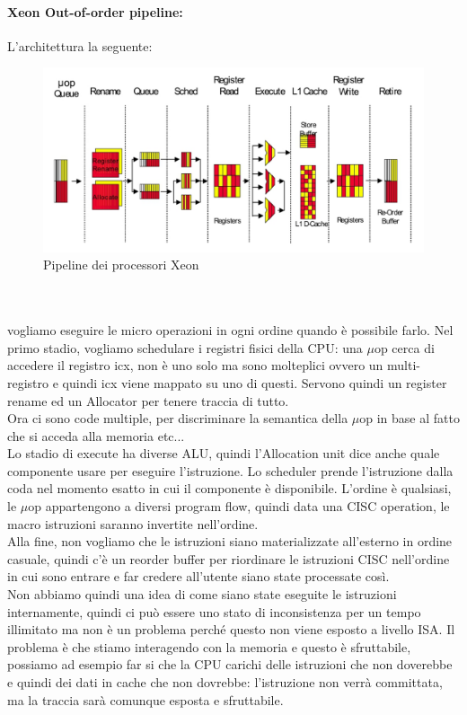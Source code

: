 \documentclass[12pt, oneside]{extbook} %
\begin{document}
\paragraph{Xeon Out-of-order pipeline:}
L'architettura  la seguente:\\
\begin{figure}[!h]
	\includegraphics[scale=0.5]{immagini/xeon_ooo.png}
	\caption{Pipeline dei processori Xeon}
\end{figure}\\\\
vogliamo eseguire le micro operazioni in ogni ordine quando è possibile farlo. Nel primo stadio, vogliamo schedulare i registri fisici della CPU: una $\mu$op cerca di accedere il registro icx, non è uno solo ma sono molteplici ovvero un multi-registro e quindi icx viene mappato su uno di questi. Servono quindi un register rename ed un Allocator per tenere traccia di tutto.\\ Ora ci sono code multiple, per discriminare la semantica della $\mu$op in base al fatto che si acceda alla memoria etc...\\ Lo stadio di execute ha diverse ALU, quindi l'Allocation unit dice anche quale componente usare per eseguire l'istruzione. Lo scheduler prende l'istruzione dalla coda nel momento esatto in cui il componente è disponibile. L'ordine è qualsiasi, le $\mu$op appartengono a diversi program flow, quindi data una CISC operation, le macro istruzioni saranno invertite nell'ordine. \\ Alla fine, non vogliamo che le istruzioni siano materializzate all'esterno in ordine casuale, quindi c'è un reorder buffer per riordinare le istruzioni CISC nell'ordine in cui sono entrare e far credere all'utente siano state processate così.\\ Non abbiamo quindi una idea di come siano state eseguite le istruzioni internamente, quindi ci può essere uno stato di inconsistenza per un tempo illimitato ma non è un problema perché questo non viene esposto a livello ISA. Il problema è che stiamo interagendo con la memoria e questo è sfruttabile, possiamo ad esempio far si che la CPU carichi delle istruzioni che non doverebbe e quindi dei dati in cache che non dovrebbe: l'istruzione non verrà committata, ma la traccia sarà comunque esposta e sfruttabile.
\end{document}
